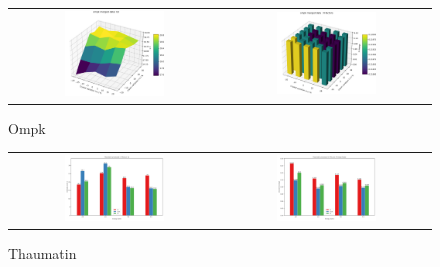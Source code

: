 \begin{figure}[h]
    \centering
    \begin{tabular}{cc}
    \includegraphics[width = 0.5\textwidth]{plots/exp0/ompk_merged_Isig.png} & \includegraphics[width = 0.5\textwidth]{plots/exp0/ompk_merged_rmerge.png}
    \end{tabular}
    \caption{Ompk}
    \label{fig:ompk_stats}
\end{figure}


\begin{figure}[h]
    \centering
    \begin{tabular}{cc}
    \includegraphics[width = 0.5\textwidth]{plots/exp0/thaum_Isig.png} & \includegraphics[width = 0.5\textwidth]{plots/exp0/thaum_rmerges.png}
    \end{tabular}
    \caption{Thaumatin}
    \label{fig:thaum1_stats}
\end{figure}





